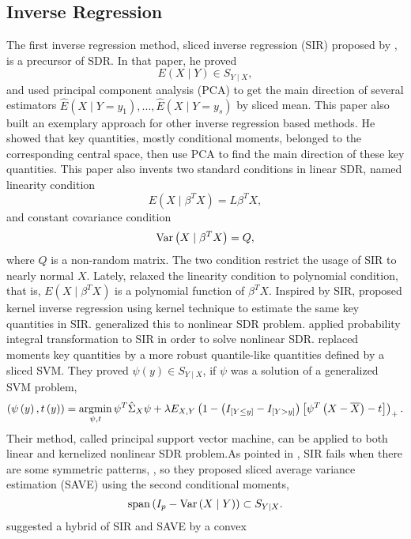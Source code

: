 \subsection{Inverse Regression }

The first inverse regression method, sliced inverse regression (SIR)
proposed by  \citet{li1991sliced}, is a precursor of SDR. In that
paper, he proved 
\[
E\left(X\mid Y\right)\in S_{Y\mid X},
\]
and used principal component analysis (PCA) to get the main direction
of several estimators $\hat{E}\left(X\mid Y=y_{1}\right),\ldots,\hat{E}\left(X\mid Y=y_{s}\right)$
by sliced mean. This paper also built an exemplary approach for other inverse
regression based methods. He showed that key quantities, mostly
conditional moments, belonged to the corresponding central space, then
use PCA to find the main direction of these key quantities. This paper
also invents two standard conditions in linear SDR, named linearity
condition 
\[
E\left(X\mid\beta^{T}X\right)=L\beta^{T}X,
\]
and constant covariance condition 
\[
\mathrm{Var}\left(X\mid\beta^{T}X\right)=Q,
\]
where $Q$ is a non-random matrix. The two condition restrict the
usage of SIR to nearly normal $X$. Lately, \citet{dong2010dimension}
relaxed the linearity condition to polynomial condition, that is,
$E\left(X\mid\beta^{T}X\right)$ is a polynomial function of $\beta^{T}X$.
Inspired by SIR, \citet{zhu1996asymptotics} proposed kernel inverse
regression using kernel technique to estimate the same key quantities
in SIR. \citet{wu2008kernel} generalized this to nonlinear SDR problem.
\citet{wang2014transformed} applied probability integral transformation
to SIR in order to solve nonlinear SDR. \citet{li2011principal} replaced
moments key quantities by a more robust quantile-like quantities defined
by a sliced SVM. They proved $\psi\left(y\right)\in S_{Y\mid X}$,
if $\psi$ was a solution of a generalized SVM problem, 
\[
\left(\psi\left(y\right),t\left(y\right)\right)=\operatorname*{\arg\!\min}_{\psi,t}\psi^{T}\hat{\Sigma}_{X}\psi+\lambda E_{X,Y}\left(1-\left(I_{\left[Y\le y\right]}-I_{\left[Y>y\right]}\right)\left[\psi^{T}\left(X-\overline{X}\right)-t\right]\right)_{+}.
\]
Their method, called principal support vector machine, can be applied
to both linear and kernelized nonlinear SDR problem.As pointed in
\citet{1991}, SIR fails when there are some symmetric patterns, ,
so they proposed sliced average variance estimation (SAVE) using the
second conditional moments, 
\[
\mathrm{span}\left(I_{p}-\mathrm{Var}\left(X\mid Y\right)\right)\subset S_{Y\mid X}.
\]
\citet{zhu2007hybrid} suggested a hybrid of SIR and SAVE by a convex
